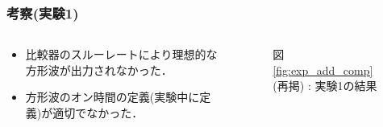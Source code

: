 \documentclass[mathsans]{beamer} %
\begin{document}
\begin{frame}
  \frametitle{考察(実験1)}
  \begin{columns}
    \begin{column}{.45\linewidth}
      \begin{itemize}
        \item 比較器のスルーレートにより理想的な方形波が出力されなかった．
        \item 方形波のオン時間の定義(実験中に定義)が適切でなかった．
      \end{itemize}
    \end{column}
    \begin{column}{.5\linewidth}

      \begin{figure}[htbp]
        \begin{center}
          \vspace{-1em}
          {図 \ref{fig:exp_add_comp}(再掲) : 実験1の結果}
        \end{center}
      \end{figure}
    \end{column}
  \end{columns}
\end{frame}
\end{document}
